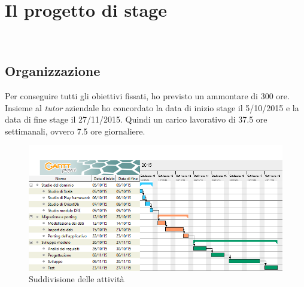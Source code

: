 
\chapter{Il progetto di stage}
\label{cap:il-progetto-di-stage}
\\




\section{Organizzazione}
Per conseguire tutti gli obiettivi fissati, ho previsto un ammontare di 300 ore. Insieme al \emph{tutor} aziendale ho concordato la data di inizio stage il 5/10/2015 e la data di fine stage il 27/11/2015. Quindi un carico lavorativo di 37.5 ore settimanali, ovvero 7.5 ore giornaliere. 
\begin{figure}[h]
\centering
\includegraphics[scale=0.52]{immagini/gantt}
\caption{Suddivisione delle attività}
\label{fig:gantt}
\end{figure}
\newpage
